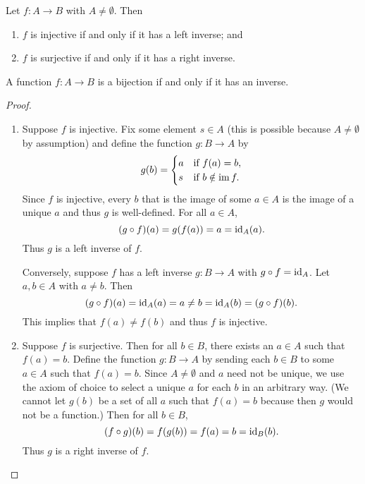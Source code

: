 \begin{theorem}
    Let \(f: A \to B\) with \(A \neq \emptyset\). Then
    \begin{enumerate}[label=(\alph*)]
        \item \(f\) is injective if and only if it has a left inverse; and
        \item \(f\) is surjective if and only if it has a right inverse.
    \end{enumerate}
\end{theorem}

\begin{corollary}
    A function \(f: A \to B\) is a bijection if and only if it has an inverse.
\end{corollary}

\begin{proof}\(\)

    \begin{enumerate}[label=(\alph*), wide]
        \item Suppose \(f\) is injective. Fix some element \(s \in A\) (this is
        possible because \(A \neq \emptyset\) by assumption) and define the
        function \(g : B \to A\) by
        \[
            g(b) = \begin{cases}
                a & \text{if } f(a) = b, \\
                s & \text{if } b \notin \operatorname{im} f.
            \end{cases}
        \]
        Since \(f\) is injective, every \(b\) that is the image of some \(a \in
        A\) is the image of a unique \(a\) and thus \(g\) is well-defined. For
        all \(a \in A\),
        \[
            (g \circ f)(a) = g(f(a)) = a = \operatorname{id}_A(a).
        \]
        Thus \(g\) is a left inverse of \(f\).

        Conversely, suppose \(f\) has a left inverse \(g : B \to A\) with \(g
        \circ f = \operatorname{id}_A\). Let \(a, b \in A\) with \(a \neq b\). Then
        \[
            (g \circ f)(a) = \operatorname{id}_A(a) = a \neq b = \operatorname{id}_A(b) = (g \circ f)(b).
        \]
        This implies that \(f(a) \neq f(b)\) and thus \(f\) is injective.

        \item Suppose \(f\) is surjective. Then for all \(b \in B\), there
        exists an \(a \in A\) such that \(f(a) = b\). Define the function \(g :
        B \to A\) by sending each \(b \in B\) to some \(a \in A\) such that
        \(f(a) = b\). Since \(A \neq \emptyset\) and \(a\) need not be unique, we use the axiom of choice
        to select a unique \(a\) for each \(b\) in an arbitrary way. (We cannot
        let \(g(b)\) be a set of all \(a\) such that \(f(a) = b\) because then
        \(g\) would not be a function.) Then for all \(b \in B\),
        \[
            (f \circ g)(b) = f(g(b)) = f(a) = b = \operatorname{id}_B(b).
        \]
        Thus \(g\) is a right inverse of \(f\).


\end{enumerate}
\end{proof}
